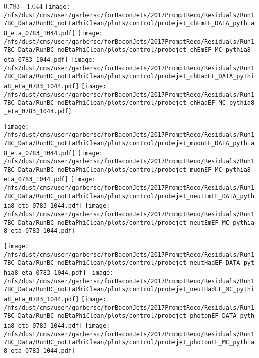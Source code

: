 \documentclass[t,compress]{beamer}
\begin{document}
\begin{frame}{0.783 - 1.044}
	\texttt{[image: /nfs/dust/cms/user/garbersc/forBaconJets/2017PromptReco/Residuals/Run17BC\_Data/RunBC\_noEtaPhiClean/plots/control/probejet\_chEmEF\_DATA\_pythia8\_eta\_0783\_1044.pdf]}
	\texttt{[image: /nfs/dust/cms/user/garbersc/forBaconJets/2017PromptReco/Residuals/Run17BC\_Data/RunBC\_noEtaPhiClean/plots/control/probejet\_chEmEF\_MC\_pythia8\_eta\_0783\_1044.pdf]}
	\texttt{[image: /nfs/dust/cms/user/garbersc/forBaconJets/2017PromptReco/Residuals/Run17BC\_Data/RunBC\_noEtaPhiClean/plots/control/probejet\_chHadEF\_DATA\_pythia8\_eta\_0783\_1044.pdf]}
	\texttt{[image: /nfs/dust/cms/user/garbersc/forBaconJets/2017PromptReco/Residuals/Run17BC\_Data/RunBC\_noEtaPhiClean/plots/control/probejet\_chHadEF\_MC\_pythia8\_eta\_0783\_1044.pdf]}
\newline

\vspace{-0.65cm}
	\texttt{[image: /nfs/dust/cms/user/garbersc/forBaconJets/2017PromptReco/Residuals/Run17BC\_Data/RunBC\_noEtaPhiClean/plots/control/probejet\_muonEF\_DATA\_pythia8\_eta\_0783\_1044.pdf]}
	\texttt{[image: /nfs/dust/cms/user/garbersc/forBaconJets/2017PromptReco/Residuals/Run17BC\_Data/RunBC\_noEtaPhiClean/plots/control/probejet\_muonEF\_MC\_pythia8\_eta\_0783\_1044.pdf]}
	\texttt{[image: /nfs/dust/cms/user/garbersc/forBaconJets/2017PromptReco/Residuals/Run17BC\_Data/RunBC\_noEtaPhiClean/plots/control/probejet\_neutEmEF\_DATA\_pythia8\_eta\_0783\_1044.pdf]}
	\texttt{[image: /nfs/dust/cms/user/garbersc/forBaconJets/2017PromptReco/Residuals/Run17BC\_Data/RunBC\_noEtaPhiClean/plots/control/probejet\_neutEmEF\_MC\_pythia8\_eta\_0783\_1044.pdf]}
\newline

\vspace{-0.65cm}
	\texttt{[image: /nfs/dust/cms/user/garbersc/forBaconJets/2017PromptReco/Residuals/Run17BC\_Data/RunBC\_noEtaPhiClean/plots/control/probejet\_neutHadEF\_DATA\_pythia8\_eta\_0783\_1044.pdf]}
	\texttt{[image: /nfs/dust/cms/user/garbersc/forBaconJets/2017PromptReco/Residuals/Run17BC\_Data/RunBC\_noEtaPhiClean/plots/control/probejet\_neutHadEF\_MC\_pythia8\_eta\_0783\_1044.pdf]}
	\texttt{[image: /nfs/dust/cms/user/garbersc/forBaconJets/2017PromptReco/Residuals/Run17BC\_Data/RunBC\_noEtaPhiClean/plots/control/probejet\_photonEF\_DATA\_pythia8\_eta\_0783\_1044.pdf]}
	\texttt{[image: /nfs/dust/cms/user/garbersc/forBaconJets/2017PromptReco/Residuals/Run17BC\_Data/RunBC\_noEtaPhiClean/plots/control/probejet\_photonEF\_MC\_pythia8\_eta\_0783\_1044.pdf]}
\end{frame}
\end{document}
